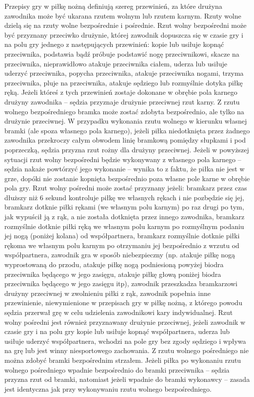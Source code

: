 \documentclass[14pt,oneside,a4paper]{book}
\theoremstyle{break}
\begin{document}
Przepisy gry w piłkę nożną definiują szereg przewinień, za które drużyna zawodnika może być ukarana rzutem wolnym lub rzutem karnym. Rzuty wolne dzielą się na rzuty wolne bezpośrednie i pośrednie. Rzut wolny bezpośredni może być przyznany przeciwko drużynie, której zawodnik dopuszcza się w czasie gry i na polu gry jednego z następujących przewinień: kopie lub usiłuje kopnąć przeciwnika, podstawia bądź próbuje podstawić nogę przeciwnikowi, skacze na przeciwnika, nieprawidłowo atakuje przeciwnika ciałem, uderza lub usiłuje uderzyć przeciwnika, popycha przeciwnika, atakuje przeciwnika nogami, trzyma przeciwnika, pluje na przeciwnika, atakuje sędziego lub rozmyślnie dotyka piłkę ręką. Jeżeli któreś z tych przewinień zostaje dokonane w obrębie pola karnego drużyny zawodnika – sędzia przyznaje drużynie przeciwnej rzut karny. Z rzutu wolnego bezpośredniego bramka może zostać zdobyta bezpośrednio, ale tylko na drużynie przeciwnej. W przypadku wykonania rzutu wolnego w kierunku własnej bramki (ale spoza własnego pola karnego), jeżeli piłka niedotknięta przez żadnego zawodnika przekroczy całym obwodem linię bramkową pomiędzy słupkami i pod poprzeczką, sędzia przyzna rzut rożny dla drużyny przeciwnej. Jeżeli w powyższej sytuacji rzut wolny bezpośredni będzie wykonywany z własnego pola karnego – sędzia nakaże powtórzyć jego wykonanie – wynika to z faktu, że piłka nie jest w grze, dopóki nie zostanie kopnięta bezpośrednio poza własne pole karne w obrębie pola gry. Rzut wolny pośredni może zostać przyznany jeżeli: bramkarz przez czas dłuższy niż 6 sekund kontroluje piłkę we własnych rękach i nie pozbędzie się jej, bramkarz dotknie piłki rękami (we własnym polu karnym) po raz drugi po tym, jak wypuścił ją z rąk, a nie została dotknięta przez innego zawodnika, bramkarz rozmyślnie dotknie piłki ręką we własnym polu karnym po rozmyślnym podaniu jej nogą (poniżej kolana) od współpartnera, bramkarz rozmyślnie dotknie piłki rękoma we własnym polu karnym po otrzymaniu jej bezpośrednio z wrzutu od współpartnera, zawodnik gra w sposób niebezpieczny (np. atakuje piłkę nogą wyprostowaną do przodu, atakuje piłkę nogą podniesioną powyżej biodra przeciwnika będącego w jego zasięgu, atakuje piłkę głową poniżej biodra przeciwnika będącego w jego zasięgu itp), zawodnik przeszkadza bramkarzowi drużyny przeciwnej w zwolnieniu piłki z rąk, zawodnik popełnia inne przewinienie, niewymienione w przepisach gry w piłkę nożną, z którego powodu sędzia przerwał grę w celu udzielenia zawodnikowi kary indywidualnej. Rzut wolny pośredni jest również przyznawany drużynie przeciwnej, jeżeli zawodnik w czasie gry i na polu gry kopie lub usiłuje kopnąć współpartnera, uderza lub usiłuje uderzyć współpartnera, wchodzi na pole gry bez zgody sędziego i wpływa na grę lub jest winny niesportowego zachowania. Z rzutu wolnego pośredniego nie można zdobyć bramki bezpośrednim strzałem. Jeżeli piłka po wykonaniu rzutu wolnego pośredniego wpadnie bezpośrednio do bramki przeciwnika – sędzia przyzna rzut od bramki, natomiast jeżeli wpadnie do bramki wykonawcy – zasada jest identyczna jak przy wykonywaniu rzutu wolnego bezpośredniego.
\end{document}
